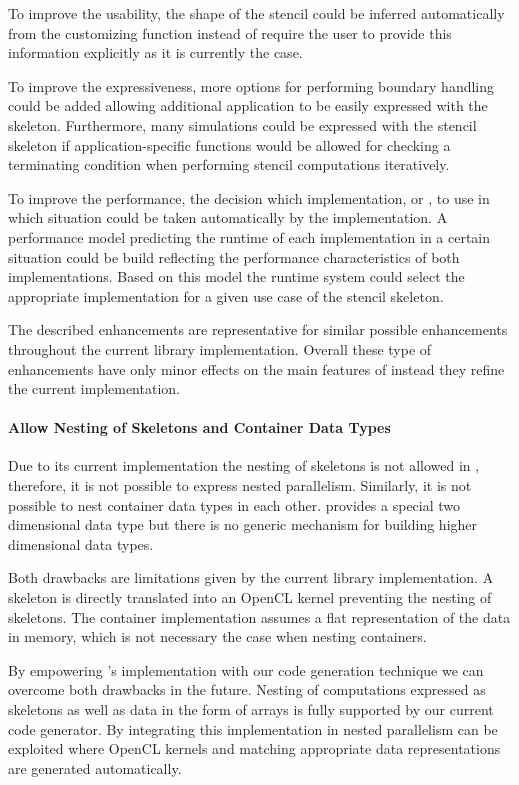 To improve the usability, the shape of the stencil could be inferred automatically from the customizing function instead of require the user to provide this information explicitly as it is currently the case.

To improve the expressiveness, more options for performing boundary handling could be added allowing additional application to be easily expressed with the skeleton.
Furthermore, many simulations could be expressed with the stencil skeleton if application-specific functions would be allowed for checking a terminating condition when performing stencil computations iteratively.

To improve the performance, the decision which implementation,  or , to use in which situation could be taken automatically by the \SkelCL implementation.
A performance model predicting the runtime of each implementation in a certain situation could be build reflecting the performance characteristics of both implementations.
Based on this model the runtime system could select the appropriate implementation for a given use case of the stencil skeleton.

\bigskip
The described enhancements are representative for similar possible enhancements throughout the current \SkelCL library implementation.
Overall these type of enhancements have only minor effects on the main features of \SkelCL instead they refine the current \SkelCL implementation.

\paragraph{Allow Nesting of Skeletons and Container Data Types}
Due to its current implementation the nesting of skeletons is not allowed in \SkelCL, therefore, it is not possible to express nested parallelism.
Similarly, it is not possible to nest container data types in each other.
\SkelCL provides a special two dimensional data type but there is no generic mechanism for building higher dimensional data types.

Both drawbacks are limitations given by the current library implementation.
A skeleton is directly translated into an OpenCL kernel preventing the nesting of skeletons.
The container implementation assumes a flat representation of the data in memory, which is not necessary the case when nesting containers.

By empowering \SkelCL's implementation with our code generation technique we can overcome both drawbacks in the future.
Nesting of computations expressed as skeletons as well as data in the form of arrays is fully supported by our current code generator.
By integrating this implementation in \SkelCL nested parallelism can be exploited where OpenCL kernels and matching appropriate data representations are generated automatically.

